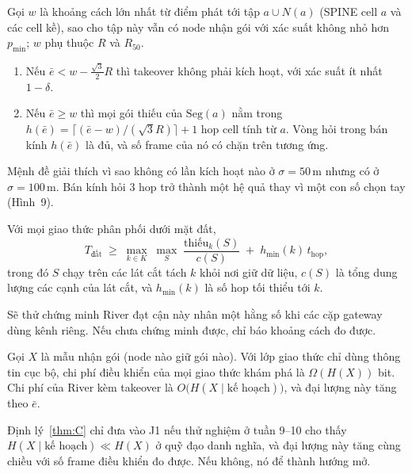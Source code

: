 \setcounter{proposition}{1}
\begin{proposition}\label{prop:B}
Gọi $w$ là khoảng cách lớn nhất từ điểm phát tới tập $a\cup N(a)$ (SPINE cell $a$ và các cell kề), sao cho tập này vẫn có node nhận gói với xác suất không nhỏ hơn $p_{\min}$; $w$ phụ thuộc $R$ và $R_{50}$.
\begin{enumerate}
\item[(i)] Nếu $\bar e< w-\tfrac{\sqrt3}{2}R$ thì takeover không phải kích hoạt, với xác suất ít nhất $1-\delta$.
\item[(ii)] Nếu $\bar e\ge w$ thì mọi gói thiếu của $\mathrm{Seg}(a)$ nằm trong $h(\bar e)=\big\lceil(\bar e-w)/(\sqrt3R)\big\rceil+1$ hop cell tính từ $a$. Vòng hỏi trong bán kính $h(\bar e)$ là đủ, và số frame của nó có chặn trên tương ứng.
\end{enumerate}
\end{proposition}
\noindent Mệnh đề giải thích vì sao không có lần kích hoạt nào ở $\sigma=50$\,m nhưng có ở $\sigma=100$\,m. Bán kính hỏi 3 hop trở thành một hệ quả thay vì một con số chọn tay (Hình~9).


\setcounter{proposition}{3}
\begin{proposition}\label{prop:D}
Với mọi giao thức phân phối dưới mặt đất,
\[
T_{\text{đất}}\;\ge\;\max_{k\in K}\;\max_{S}\;\frac{\mathrm{thiếu}_k(S)}{c(S)}\;+\;h_{\min}(k)\,t_{\text{hop}},
\]
trong đó $S$ chạy trên các lát cắt tách $k$ khỏi nơi giữ dữ liệu, $c(S)$ là tổng dung lượng các cạnh của lát cắt, và $h_{\min}(k)$ là số hop tối thiểu tới $k$.
\end{proposition}
\noindent Sẽ thử chứng minh River đạt cận này nhân một hằng số khi các cặp gateway dùng kênh riêng. Nếu chưa chứng minh được, chỉ báo khoảng cách đo được.

\setcounter{theorem}{2}
\begin{theorem}\label{thm:C}
Gọi $X$ là mẫu nhận gói (node nào giữ gói nào). Với lớp giao thức chỉ dùng thông tin cục bộ, chi phí điều khiển của mọi giao thức khám phá là $\Omega(H(X))$ bit. Chi phí của River kèm takeover là $O\big(H(X\mid\text{kế hoạch})\big)$, và đại lượng này tăng theo $\bar e$.
\end{theorem}
\noindent Định lý~\ref{thm:C} chỉ đưa vào J1 nếu thử nghiệm ở tuần 9–10 cho thấy $H(X\mid\text{kế hoạch})\ll H(X)$ ở quỹ đạo danh nghĩa, và đại lượng này tăng cùng chiều với số frame điều khiển đo được. Nếu không, nó để thành hướng mở.

